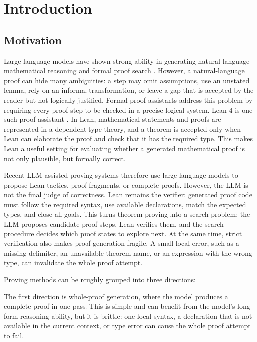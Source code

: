 \chapter{Introduction}

\section{Motivation}

Large language models have shown strong ability in generating natural-language mathematical reasoning and formal proof search \citep{polu2020gptf,yang2023leandojo,xin2024deepseekproverv15}. 
However, a natural-language proof can hide many ambiguities: a step may omit assumptions, use an unstated lemma, rely on an informal transformation, or leave a gap that is accepted by the reader but not logically justified.
Formal proof assistants address this problem by requiring every proof step to be checked in a precise logical system. Lean 4 is one such proof assistant \citep{demoura2021lean4}. In Lean, mathematical statements and proofs are represented in a dependent type theory, and a theorem is accepted only when Lean can elaborate the proof and check that it has the required type. This makes Lean a useful setting for evaluating whether a generated mathematical proof is not only plausible, but formally correct.

Recent LLM-assisted proving systems therefore use large language models to propose Lean tactics, proof fragments, or complete proofs. 
However, the LLM is not the final judge of correctness. Lean remains the verifier: generated proof code must follow the required syntax, use available declarations, match the expected types, and close all goals.
This turns theorem proving into a search problem: the LLM proposes candidate proof steps, Lean verifies them, and the search procedure decides which proof states to explore next. 
At the same time, strict verification also makes proof generation fragile. A small local error, such as a missing delimiter, an unavailable theorem name, or an expression with the wrong type, can invalidate the whole proof attempt.

Proving methods can be roughly grouped into three directions: 

The first direction is whole-proof generation, where the model produces a complete proof in one pass. This is simple and can benefit from the model's long-form reasoning ability, but it is brittle: one local syntax, a declaration that is not available in the current context, or type error can cause the whole proof attempt to fail.

